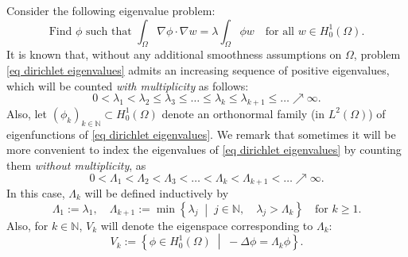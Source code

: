 \documentclass[a4paper,11pt]{article}
\newcommand\setbld[2]{\left\{ #1 \;\middle |\; #2\right\}}
\numberwithin{equation}{section}
\begin{document}
Consider the following eigenvalue problem:
\begin{equation}\label{eq dirichlet eigenvalues}
\text{Find $\phi$ such that } \int_\Omega \nabla\phi\cdot\nabla w = \lambda \int_\Omega \phi w \quad \text{for all }w\in H_0^1(\Omega). 
\end{equation}
It is known that, without any additional smoothness assumptions on $\Omega$, problem \eqref{eq dirichlet eigenvalues} admits an increasing sequence of positive eigenvalues, which will be counted \emph{with multiplicity} as follows:
\begin{equation*}
    0<\lambda_1<\lambda_2\le \lambda_3\le \dots \le \lambda_k\le \lambda_{k+1}\le \dots \nearrow \infty.
\end{equation*}
Also, let $(\phi_k)_{k\in\mathbb{N}}\subset H_0^1(\Omega)$ denote an orthonormal family (in $L^2(\Omega)$) of eigenfunctions of \eqref{eq dirichlet eigenvalues}. 
We remark that sometimes it will be more convenient to index the eigenvalues of \eqref{eq dirichlet eigenvalues} by counting them \emph{without multiplicity}, as 
\begin{equation*}
0<\Lambda_1<\Lambda_2<\Lambda_3<\dots<\Lambda_k<\Lambda_{k+1}<\dots\nearrow\infty.
\end{equation*}
In this case, $\Lambda_k$ will be defined inductively by 
\begin{equation*}
    \Lambda_1:=\lambda_1, \quad \Lambda_{k+1}:=\min \setbld{\lambda_j}{j\in \mathbb{N},\quad \lambda_j>\Lambda_k}\quad \text{for }k\ge 1.
\end{equation*}
Also, for $k\in \mathbb{N}$, $V_k$ will denote the eigenspace corresponding to $\Lambda_k$:
\begin{equation*}
    V_k:=\setbld{\phi\in H_0^1(\Omega)}{-\Delta\phi=\Lambda_k\phi}.
\end{equation*}
\end{document}
